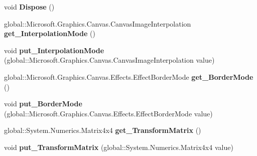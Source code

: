 \begin{DoxyCompactItemize}
void {\bfseries Dispose} ()
\item 
\mbox{\label{class_microsoft_1_1_graphics_1_1_canvas_1_1_effects_1_1_transform3_d_effect_a92c6d9ac604d9adcc898ee36205ad9bd}} 
global\+::\+Microsoft.\+Graphics.\+Canvas.\+Canvas\+Image\+Interpolation {\bfseries get\+\_\+\+Interpolation\+Mode} ()
\item 
\mbox{\label{class_microsoft_1_1_graphics_1_1_canvas_1_1_effects_1_1_transform3_d_effect_a38d32bf836b68f42f30afd88937f6280}} 
void {\bfseries put\+\_\+\+Interpolation\+Mode} (global\+::\+Microsoft.\+Graphics.\+Canvas.\+Canvas\+Image\+Interpolation value)
\item 
\mbox{\label{class_microsoft_1_1_graphics_1_1_canvas_1_1_effects_1_1_transform3_d_effect_ad947ca8fd0e8f553756452097191b3e9}} 
global\+::\+Microsoft.\+Graphics.\+Canvas.\+Effects.\+Effect\+Border\+Mode {\bfseries get\+\_\+\+Border\+Mode} ()
\item 
\mbox{\label{class_microsoft_1_1_graphics_1_1_canvas_1_1_effects_1_1_transform3_d_effect_a8f41e3d39b88ba94f977519171bf2446}} 
void {\bfseries put\+\_\+\+Border\+Mode} (global\+::\+Microsoft.\+Graphics.\+Canvas.\+Effects.\+Effect\+Border\+Mode value)
\item 
\mbox{\label{class_microsoft_1_1_graphics_1_1_canvas_1_1_effects_1_1_transform3_d_effect_aa80b16ff5d14dca3bcbf428286d5496c}} 
global\+::\+System.\+Numerics.\+Matrix4x4 {\bfseries get\+\_\+\+Transform\+Matrix} ()
\item 
\mbox{\label{class_microsoft_1_1_graphics_1_1_canvas_1_1_effects_1_1_transform3_d_effect_a1a29836c35514b1d6cf8834255c05da7}} 
void {\bfseries put\+\_\+\+Transform\+Matrix} (global\+::\+System.\+Numerics.\+Matrix4x4 value)
\item 
\mbox{\label{class_microsoft_1_1_graphics_1_1_canvas_1_1_effects_1_1_transform3_d_effect_aabf75189a0a2858c19e9e0c431ee3e81}} 

\end{DoxyCompactItemize}
